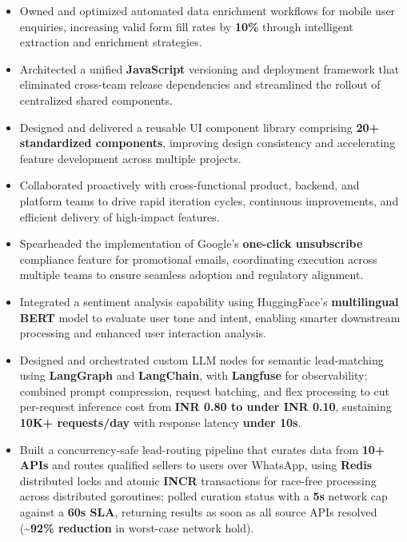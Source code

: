 \documentclass[8pt,a4paper]{extarticle}
\begin{document}
\begin{itemize}
\item Owned and optimized automated data enrichment workflows for mobile user enquiries, increasing valid form fill rates by \textbf{10\%} through intelligent extraction and enrichment strategies.
\item Architected a unified \textbf{JavaScript} versioning and deployment framework that eliminated cross-team release dependencies and streamlined the rollout of centralized shared components.
\item Designed and delivered a reusable UI component library comprising \textbf{20+ standardized components}, improving design consistency and accelerating feature development across multiple projects.
\item Collaborated proactively with cross-functional product, backend, and platform teams to drive rapid iteration cycles, continuous improvements, and efficient delivery of high-impact features.
\item Spearheaded the implementation of Google's \textbf{one-click unsubscribe} compliance feature for promotional emails, coordinating execution across multiple teams to ensure seamless adoption and regulatory alignment.
\item Integrated a sentiment analysis capability using HuggingFace's \textbf{multilingual BERT} model to evaluate user tone and intent, enabling smarter downstream processing and enhanced user interaction analysis.
\item Designed and orchestrated custom LLM nodes for semantic lead-matching using \textbf{LangGraph} and \textbf{LangChain}, with \textbf{Langfuse} for observability; combined prompt compression, request batching, and flex processing to cut per-request inference cost from \textbf{INR 0.80 to under INR 0.10}, sustaining \textbf{10K+ requests/day} with response latency \textbf{under 10s}.
\item Built a concurrency-safe lead-routing pipeline that curates data from \textbf{10+ APIs} and routes qualified sellers to users over WhatsApp, using \textbf{Redis} distributed locks and atomic \textbf{INCR} transactions for race-free processing across distributed goroutines; polled curation status with a \textbf{5s} network cap against a \textbf{60s SLA}, returning results as soon as all source APIs resolved (\textbf{\textasciitilde{}92\% reduction} in worst-case network hold).
\end{itemize}
\end{document}
